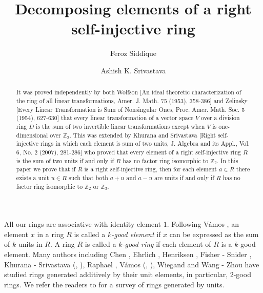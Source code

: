\documentclass{amsart}
\begin{document}
\title{Decomposing elements of a right self-injective ring}
\author{Feroz Siddique}
\address{Department of Mathematics and Computer Science, St. Louis University, St.
Louis, MO-63103, USA}
\author{Ashish K. Srivastava}
\address{Department of Mathematics and Computer Science, St. Louis University, St.
Louis, MO-63103, USA}


\begin{abstract}
It was proved independently by both Wolfson [An ideal theoretic characterization of the ring of all
linear transformations, Amer. J. Math. 75 (1953), 358-386] and Zelinsky [Every Linear Transformation is Sum of Nonsingular Ones,
Proc. Amer. Math. Soc. 5 (1954), 627-630] that every linear transformation of a vector space $V$ over a division ring $D$ is the sum of two invertible linear transformations except when $V$ is one-dimensional over $\mathbb Z_2$. This was extended by Khurana and Srivastava [Right self-injective rings in which each element is sum of two units, J. Algebra and its Appl., Vol. 6, No. 2 (2007), 281-286] who proved that every element of a right self-injective ring $R$ is the sum of two units if and only if $R$ has no factor ring isomorphic to $\mathbb Z_2$. In this paper we prove that if $R$ is a right self-injective ring, then for each element $a\in R$ there exists a unit $u\in R$ such that both $a+u$ and $a-u$ are units if and only if $R$ has no factor ring isomorphic to $\mathbb Z_2$ or $\mathbb Z_3$. 
\end{abstract}

\maketitle

\noindent All our rings are associative with identity element $1$. Following V\'{a}mos \cite{Vamos}, an element $x$ in a ring $R$ is called a {\it $k$-good element} if $x$ can be expressed as the sum of $k$ units in $R$. A ring $R$ is called a {\it $k$-good ring} if each element of $R$ is a $k$-good element. Many authors including Chen \cite{Chen1}, Ehrlich \cite{Ehrlich}, Henriksen \cite{Henriksen1}, Fisher - Snider \cite{FS}, Khurana - Srivastava (\cite{KS1}, \cite{KS2}), Raphael \cite{Raphael}, V\'{a}mos (\cite{Vamos}, \cite{VW}), Wiegand \cite{VW} and Wang - Zhou \cite{WZ} have studied rings generated additively by their unit elements, in particular, $2$-good rings. We refer the readers to \cite{Sri} for a survey of rings generated by units.
\end{document}
